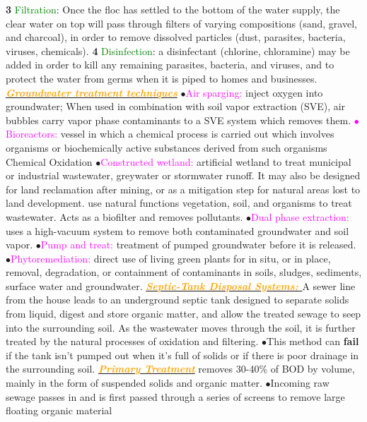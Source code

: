 \documentclass{article}
\newcommand{\ddd}{$\bullet$}
\newcommand{\green}[1]{\textcolor{green}{#1}}
\newcommand{\pink}[1]{\textcolor{magenta}{#1}}
\newcommand{\orange}[1]{\textcolor{orange}{#1}}
\newcommand{\mysubsection}[1]{\underline{\textbf{{\textit{\orange{#1}}}}}}
\newcommand{\mysubsub}[1]{{{\green{#1}}}}
\newcommand{\vocab}[1]{{\pink{#1}}}
\begin{document}
\begin{multicols*}{4}
    		\textbf{3} \mysubsub{Filtration}: Once the floc has settled to the bottom of the water supply, the clear water on top will pass through filters of varying compositions (sand, gravel, and charcoal), in order to remove dissolved particles (dust, parasites, bacteria, viruses, chemicals).
    		\textbf{4} \mysubsub{Disinfection}: a disinfectant (chlorine, chloramine) may be added in order to kill any remaining parasites, bacteria, and viruses, and to protect the water from germs when it is piped to homes and businesses.
        \mysubsection{Groundwater treatment techniques}
             \ddd \vocab{Air sparging:} inject oxygen into groundwater; When used in combination with soil vapor extraction (SVE), air bubbles carry vapor phase contaminants to a SVE system which removes them. 
             \vocab{\ddd Bioreactors: }vessel in which a chemical process is carried out which involves organisms or biochemically active substances derived from such organisms Chemical Oxidation 
             \ddd \vocab{Constructed wetland: } artificial wetland to treat municipal or industrial wastewater, greywater or stormwater runoff. It may also be designed for land reclamation after mining, or as a mitigation step for natural areas lost to land development. use natural functions vegetation, soil, and organisms to treat wastewater. Acts as a biofilter and removes pollutants.
             \ddd \vocab{Dual phase extraction: } uses a high-vacuum system to remove both contaminated groundwater and soil vapor. 
             \ddd \vocab{Pump and treat: } treatment of pumped groundwater before it is released. 
             \ddd \vocab{Phytoremediation: }direct use of living green plants for in situ, or in place, removal, degradation, or containment of contaminants in soils, sludges, sediments, surface water and groundwater. 
        \mysubsection{Septic-Tank Disposal Systems: }
            A sewer line from the house leads to an underground septic tank designed to separate solids from liquid, digest and store organic matter, and allow the treated sewage to seep into the surrounding soil. As the wastewater moves through the soil, it is further treated by the natural processes of oxidation and filtering.
            \ddd This method can \textbf{fail} if the tank isn't pumped out when it's full of solids or if there is poor drainage in the surrounding soil.
        \mysubsection{Primary Treatment} 
            removes 30-40\% of BOD by volume, mainly in the form of suspended solids and organic matter. 
            \ddd Incoming raw sewage passes in and is first passed through a series of screens to remove large floating organic material

\end{multicols*}
\end{document}
